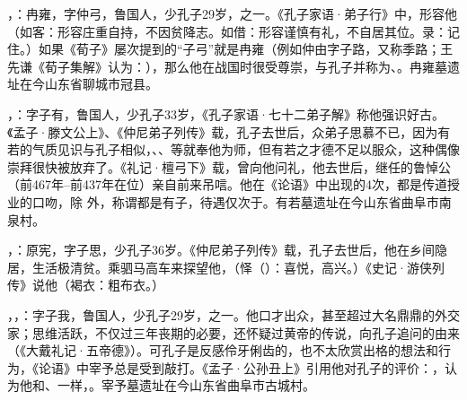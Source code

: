，：冉雍，字仲弓，鲁国人，少孔子29岁，之一。《孔子家语·弟子行》中，形容他（如客：形容庄重自持，不因贫降志。如借：形容谨慎有礼，不自居其位。录：记住。）如果《荀子》屡次提到的“子弓”就是冉雍（例如仲由字子路，又称季路；王先谦《荀子集解》认为：），那么他在战国时很受尊崇，与孔子并称为、。冉雍墓遗址在今山东省聊城市冠县。

，：字子有，鲁国人，少孔子33岁，《孔子家语·七十二弟子解》称他强识好古。《孟子·滕文公上》、《仲尼弟子列传》载，孔子去世后，众弟子思慕不已，因为有若的气质见识与孔子相似，、、等就奉他为师，但有若之才德不足以服众，这种偶像崇拜很快被放弃了。《礼记·檀弓下》载，曾向他问礼，他去世后，继任的鲁悼公（前467年--前437年在位）亲自前来吊唁。他在《论语》中出现的4次，都是传道授业的口吻，除  外，称谓都是有子，待遇仅次于。有若墓遗址在今山东省曲阜市南泉村。

，：原宪，字子思，少孔子36岁。《仲尼弟子列传》载，孔子去世后，他在乡间隐居，生活极清贫。乘驷马高车来探望他，（怿（）：喜悦，高兴。）《史记·游侠列传》说他（褐衣：粗布衣。） %

，，：字子我，鲁国人，少孔子29岁，之一。他口才出众，甚至超过大名鼎鼎的外交家；思维活跃，不仅过三年丧期的必要，还怀疑过黄帝的传说，向孔子追问的由来（《大戴礼记·五帝德》）。可孔子是反感伶牙俐齿的，也不太欣赏出格的想法和行为，《论语》中宰予总是受到敲打。《孟子·公孙丑上》引用他对孔子的评价：，认为他和、一样，。宰予墓遗址在今山东省曲阜市古城村。

